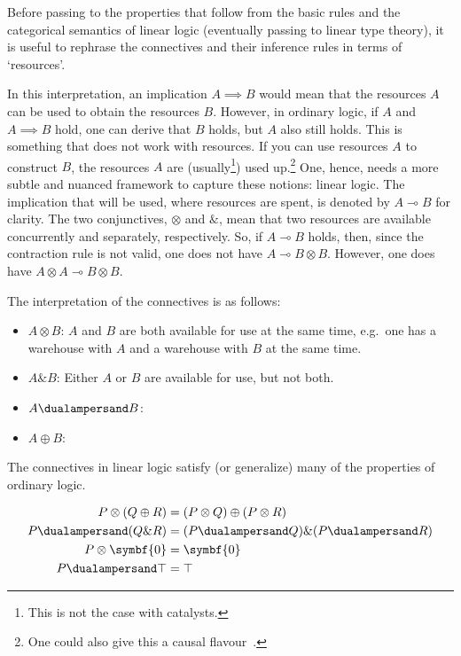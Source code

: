     \begin{remark}
        Before passing to the properties that follow from the basic rules and the categorical semantics of linear logic (eventually passing to linear type theory), it is useful to rephrase the connectives and their inference rules in terms of `resources'.

        In this interpretation, an implication $A\implies B$ would mean that the resources $A$ can be used to obtain the resources $B$. However, in ordinary logic, if $A$ and $A\implies B$ hold, one can derive that $B$ holds, but $A$ also still holds. This is something that does not work with resources. If you can use resources $A$ to construct $B$, the resources $A$ are (usually\footnote{This is not the case with catalysts.}) used up.\footnote{One could also give this a causal flavour~\citep{girard_linear_1995}.} One, hence, needs a more subtle and nuanced framework to capture these notions: linear logic. The implication that will be used, where resources are spent, is denoted by $A\multimap B$ for clarity. The two conjunctives, $\otimes$ and $\&$, mean that two resources are available concurrently and separately, respectively. So, if $A\multimap B$ holds, then, since the contraction rule is not valid, one does not have $A\multimap B\otimes B$. However, one does have $A\otimes A\multimap B\otimes B$.

        The interpretation of the connectives is as follows:
        \begin{itemize}
            \item $A\otimes B$: $A$ and $B$ are both available for use at the same time, e.g.~one has a warehouse with $A$ and a warehouse with $B$ at the same time.
            \item $A\& B$: Either $A$ or $B$ are available for use, but not both.
            \item $A\dualampersand B$:
            \item $A\oplus B$: 
        \end{itemize}
    \end{remark}

    The connectives in linear logic satisfy (or generalize) many of the properties of ordinary logic.
    \begin{property}[Distributivity]
        \begin{gather}
            \begin{aligned}
                P\otimes(Q\oplus R) &= (P\otimes Q)\oplus(P\otimes R)\\
                P\dualampersand(Q\& R) &= (P\dualampersand Q)\&(P\dualampersand R)\\
                P\otimes\symbf{0} &= \symbf{0}\\
                P\dualampersand\top &= \top
            \end{aligned}
        \end{gather}
    \end{property}

